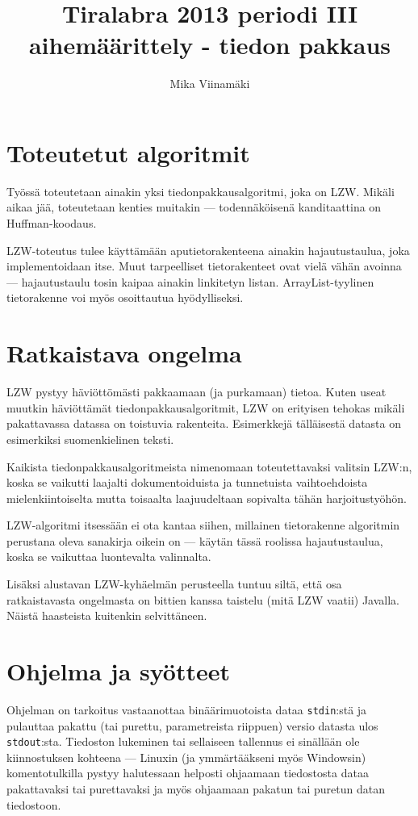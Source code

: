 \documentclass{article}
\begin{document}
\title{Tiralabra 2013 periodi III aihemäärittely - tiedon pakkaus}
\author{Mika Viinamäki}
\maketitle

\section{Toteutetut algoritmit}
Työssä toteutetaan ainakin yksi tiedonpakkausalgoritmi, joka on LZW. Mikäli aikaa jää, toteutetaan kenties muitakin --- todennäköisenä kanditaattina on Huffman-koodaus.   

LZW-toteutus tulee käyttämään aputietorakenteena ainakin hajautustaulua, joka implementoidaan itse. Muut tarpeelliset tietorakenteet ovat vielä vähän avoinna --- hajautustaulu tosin kaipaa ainakin linkitetyn listan. ArrayList-tyylinen tietorakenne voi myös osoittautua hyödylliseksi.

\section{Ratkaistava ongelma}
LZW pystyy häviöttömästi pakkaamaan (ja purkamaan) tietoa. Kuten useat muutkin häviöttämät tiedonpakkausalgoritmit, LZW on erityisen tehokas mikäli pakattavassa datassa on toistuvia rakenteita. Esimerkkejä tälläisestä datasta on esimerkiksi suomenkielinen teksti.

Kaikista tiedonpakkausalgoritmeista nimenomaan toteutettavaksi valitsin LZW:n, koska se vaikutti laajalti dokumentoiduista ja tunnetuista vaihtoehdoista mielenkiintoiselta mutta toisaalta laajuudeltaan sopivalta tähän harjoitustyöhön. 

LZW-algoritmi itsessään ei ota kantaa siihen, millainen tietorakenne algoritmin perustana oleva sanakirja oikein on --- käytän tässä roolissa hajautustaulua, koska se vaikuttaa luontevalta valinnalta.

Lisäksi alustavan LZW-kyhäelmän perusteella tuntuu siltä, että osa ratkaistavasta ongelmasta on bittien kanssa taistelu (mitä LZW vaatii) Javalla. Näistä haasteista kuitenkin selvittäneen.

\section{Ohjelma ja syötteet}
Ohjelman on tarkoitus vastaanottaa binäärimuotoista dataa \verb=stdin=:stä ja pulauttaa pakattu (tai purettu, parametreista riippuen) versio datasta ulos \verb=stdout=:sta. Tiedoston lukeminen tai sellaiseen tallennus ei sinällään ole kiinnostuksen kohteena --- Linuxin (ja ymmärtääkseni myös Windowsin) komentotulkilla pystyy halutessaan helposti ohjaamaan tiedostosta dataa pakattavaksi tai purettavaksi ja myös ohjaamaan pakatun tai puretun datan tiedostoon.
\end{document}
